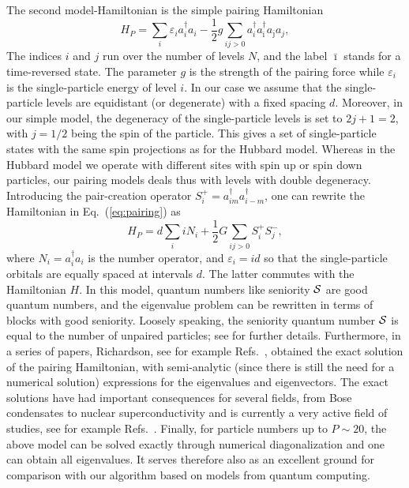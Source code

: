 The second model-Hamiltonian is the simple pairing Hamiltonian 
\begin{equation}
   H_P=\sum_i \varepsilon_i a^{\dagger}_i a_i -\frac{1}{2} g\sum_{ij>0}
           a^{\dagger}_{i}
     a^{\dagger}_{\bar{\imath}}a_{\bar{\jmath}}a_{j},
     \label{eq:pairing}
\end{equation}
 The indices $i$ and $j$ run over the number of levels $N$, and the label $\bar{\imath}$ 
stands for a time-reversed state. The parameter $g$ is the strength of the pairing force 
while $\varepsilon_i$ is the single-particle energy of level $i$. 
In our case
we assume that the single-particle levels are equidistant (or
degenerate) with a fixed spacing $d$. 
Moreover, in our simple model, the degeneracy of the single-particle
levels is set to $2j+1=2$, with $j=1/2$  
being the spin of the particle. This gives a set of single-particle
states with the same spin projections as 
for the Hubbard model.  Whereas in the Hubbard model we operate with
different sites with  
spin up or spin down particles, our pairing models deals thus with
levels  with double degeneracy. 
Introducing the pair-creation operator 
$S^+_i=a^{\dagger}_{im}a^{\dagger}_{i-m}$,
one can rewrite the Hamiltonian in 
Eq.\ (\ref{eq:pairing}) as
\[
   H_P=d\sum_iiN_i+
     \frac{1}{2} G\sum_{ij>0}S^+_iS^-_j,
\]
where  $N_i=a^{\dagger}_i a_i$
is the number operator, and 
$\varepsilon_i = id$ so that the single-particle orbitals 
are equally spaced at intervals $d$. The latter commutes with the 
Hamiltonian $H$. In this model, quantum numbers like seniority 
$\cal{S}$ are good quantum numbers, and the eigenvalue problem 
can be rewritten in terms of blocks with good seniority. 
Loosely 
speaking, the seniority quantum number $\cal{S}$ is equal to 
the number of unpaired particles; see  \cite{Talmi1993} for 
further details. 
Furthermore, in  a series of papers, Richardson, see for example 
Refs.~\cite{richardson1967,richardson1967a,richardson1963,richardson1965,richardson1965a,richardson1965b,richardson1966,richardson1966a},  
obtained the exact solution of the pairing Hamiltonian, with 
semi-analytic (since there is still the need for a numerical solution) 
expressions for the eigenvalues and eigenvectors. The exact solutions
have had important consequences for several fields, from Bose condensates to
nuclear superconductivity and is currently a very active field of studies, see for example
Refs.~\cite{dukelsky2004,rmp75mhj}.
Finally, for particle numbers up to $P \sim 20$, the above model can be 
solved exactly through numerical diagonalization and one can obtain all eigenvalues.
It serves therefore also as an excellent ground for comparison with our algorithm based
on models from quantum computing.


